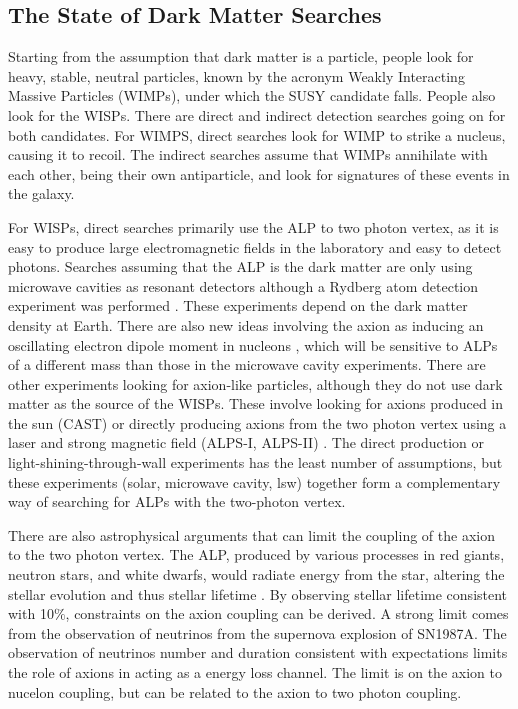 \documentclass[12pt, twoside]{book}
\begin{document}
\subsection{The State of Dark Matter Searches}

Starting from the assumption that dark matter is a particle, people look for heavy, stable, neutral particles, known by the acronym Weakly Interacting Massive Particles (WIMPs), under which the SUSY candidate falls. People also look for the WISPs. There are direct and indirect detection searches going on for both candidates. For WIMPS, direct searches look for WIMP to strike a nucleus, causing it to recoil. The indirect searches assume that WIMPs annihilate with each other, being their own antiparticle, and look for signatures of these events in the galaxy.

For WISPs, direct searches primarily use the ALP to two photon vertex, as it is easy to produce large electromagnetic fields in the laboratory and easy to detect photons. Searches assuming that the ALP is the dark matter are only using microwave cavities as resonant detectors \cite{admx10} although a Rydberg atom detection experiment was performed \cite{yamamoto00}. These experiments depend on the dark matter density at Earth. There are also new ideas involving the axion as inducing an oscillating electron dipole moment in nucleons \cite{budker13}, which will be sensitive to  ALPs of a different mass than those in the microwave cavity experiments. There are other experiments looking for axion-like particles, although they do not use dark matter as the source of the WISPs. These involve looking for axions produced in the sun (CAST) \cite{cast11} or directly producing axions from the two photon vertex using a laser and strong magnetic field (ALPS-I, ALPS-II) \cite{ehret10}. The direct production or light-shining-through-wall experiments has the least number of assumptions, but these experiments (solar, microwave cavity, lsw) together form a complementary way of searching for ALPs with the two-photon vertex.

There are also astrophysical arguments that can limit the coupling of the axion to the two photon vertex. The ALP, produced by various processes in red giants, neutron stars, and white dwarfs, would radiate energy from the star, altering the stellar evolution and thus stellar lifetime \cite{turner89}. By observing stellar lifetime consistent with 10$\%$, constraints on the axion coupling can be derived\cite{raffelt95}. A strong limit comes from the observation of neutrinos from the supernova explosion of SN1987A. The observation of neutrinos number and duration consistent with expectations limits the role of axions in acting as a energy loss channel. The limit is on the axion to nucelon coupling, but can be related to the axion to two photon coupling.
\end{document}
